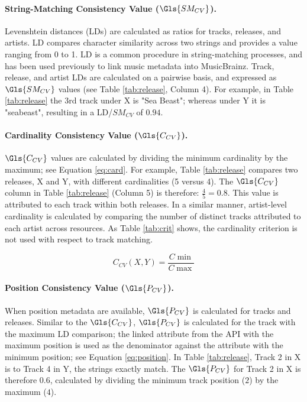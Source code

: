 \documentclass[a4paper]{article}
\newcommand{\myequations}[1]{%
\addcontentsline{equ}{myequations}{\protect\numberline{\theequation}#1}\par}
\begin{document}
\paragraph{String-Matching Consistency Value ($\Gls{SM_{CV}}$).}
Levenshtein distances (\Gls{LD}s) \cite{navarro2001guided} are calculated as ratios for tracks, releases, and artists. \Gls{LD} compares character similarity across two strings and provides a value ranging from 0 to 1. LD is a common procedure in string-matching processes, and has been used previously to link music metadata into MusicBrainz\cite{vigliensoni:00}. Track, release, and artist \Gls{LD}s are calculated on a pairwise basis, and expressed as $\Gls{SM_{CV}}$ values (see Table \ref{tab:release}, Column 4). For example, in Table \ref{tab:release} the 3rd track under X is "Sea Beast"; whereas under Y it is "seabeast", resulting in a \Gls{LD}/$SM_{CV}$ of $0.94$.

\paragraph{Cardinality Consistency Value ($\Gls{C_{CV}}$).}
$\Gls{C_{CV}}$ values are calculated by dividing the minimum cardinality by the maximum; see Equation \ref{eq:card}. For example, Table \ref{tab:release} compares two releases, X and Y, with different cardinalities (5 versus 4). The $\Gls{C_{CV}}$ column in Table \ref{tab:release} (Column 5) is therefore: $\frac{4}{5}=0.8$. This value is attributed to each track within both releases. In a similar manner, artist-level cardinality is calculated by comparing the number of distinct tracks attributed to each artist across resources. As Table \ref{tab:crit} shows, the cardinality criterion is not used with respect to track matching.

\begin{equation}
C_{CV} (X,Y) =  \frac{C \min}{C \max}
\label{eq:card}
\end{equation}
\myequations{Cardinality}

\paragraph{Position Consistency Value ($\Gls{P_{CV}}$).}
When position metadata are available, $\Gls{P_{CV}}$ is calculated for tracks and releases. Similar to the $\Gls{C_{CV}}$, $\Gls{P_{CV}}$ is calculated for the track with the maximum \Gls{LD} comparison; the linked attribute from the \Gls{API} with the maximum position is used as the denominator against the attribute with the minimum position; see Equation \ref{eq:position}. In Table \ref{tab:release}, Track 2 in X is to Track 4 in Y, the strings exactly match. The $\Gls{P_{CV}}$ for Track 2 in X is therefore $0.6$, calculated by dividing the minimum track position ($2$) by the maximum ($4$).
\end{document}
